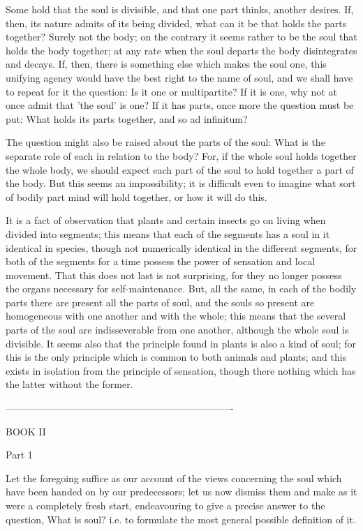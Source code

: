 Some hold that the soul is divisible, and that one part thinks, another
desires. If, then, its nature admits of its being divided, what can
it be that holds the parts together? Surely not the body; on the contrary
it seems rather to be the soul that holds the body together; at any
rate when the soul departs the body disintegrates and decays. If,
then, there is something else which makes the soul one, this unifying
agency would have the best right to the name of soul, and we shall
have to repeat for it the question: Is it one or multipartite? If
it is one, why not at once admit that 'the soul' is one? If it has
parts, once more the question must be put: What holds its parts together,
and so ad infinitum? 

The question might also be raised about the parts of the soul: What
is the separate role of each in relation to the body? For, if the
whole soul holds together the whole body, we should expect each part
of the soul to hold together a part of the body. But this seems an
impossibility; it is difficult even to imagine what sort of bodily
part mind will hold together, or how it will do this. 

It is a fact of observation that plants and certain insects go on
living when divided into segments; this means that each of the segments
has a soul in it identical in species, though not numerically identical
in the different segments, for both of the segments for a time possess
the power of sensation and local movement. That this does not last
is not surprising, for they no longer possess the organs necessary
for self-maintenance. But, all the same, in each of the bodily parts
there are present all the parts of soul, and the souls so present
are homogeneous with one another and with the whole; this means that
the several parts of the soul are indisseverable from one another,
although the whole soul is divisible. It seems also that the principle
found in plants is also a kind of soul; for this is the only principle
which is common to both animals and plants; and this exists in isolation
from the principle of sensation, though there nothing which has the
latter without the former. 

----------------------------------------------------------------------

BOOK II

Part 1 

Let the foregoing suffice as our account of the views concerning
the soul which have been handed on by our predecessors; let us now
dismiss them and make as it were a completely fresh start, endeavouring
to give a precise answer to the question, What is soul? i.e. to formulate
the most general possible definition of it. 

